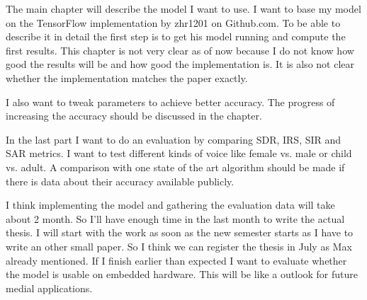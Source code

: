 \documentclass{include/2.5/sig-alternate}
\begin{document}
The main chapter will describe the model I want to use. I want to base my model on the TensorFlow implementation by zhr1201 on Github.com.
To be able to describe it in detail the first step is to get his model running and compute the first results.
This chapter is not very clear as of now because I do not know how good the results will be and how good the implementation is. It is also not clear whether the implementation matches the paper exactly.

I also want to tweak parameters to achieve better accuracy. The progress of increasing the accuracy should be discussed in the chapter.

In the last part I want to do an evaluation by comparing SDR, IRS, SIR and SAR metrics.
I want to test different kinds of voice like female vs. male or child vs. adult.
A comparison with one state of the art algorithm should be made if there is data about their accuracy available publicly.

I think implementing the model and gathering the evaluation data will take about 2 month. So I'll have enough time in the last month to write the actual thesis.
I will start with the work as soon as the new semester starts as I have to write an other small paper. So I  think we can register the thesis in July as Max already mentioned.
If I finish earlier than expected I want to evaluate whether the model is usable on embedded hardware. This will be like a outlook for future medial applications.
\end{document}
